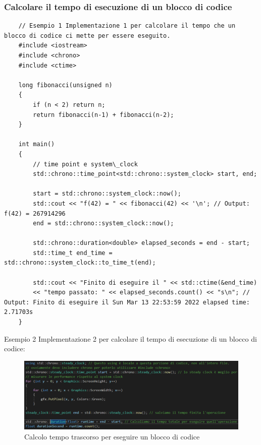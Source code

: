 \subsubsection{Calcolare il tempo di esecuzione di un blocco di codice}

\begin{lstlisting}
	// Esempio 1 Implementazione 1 per calcolare il tempo che un blocco di codice ci mette per essere eseguito.
	#include <iostream>
	#include <chrono>
	#include <ctime>
	
	long fibonacci(unsigned n)
	{
		if (n < 2) return n;
		return fibonacci(n-1) + fibonacci(n-2);
	}
	
	int main()
	{
		// time point e system\_clock
		std::chrono::time_point<std::chrono::system_clock> start, end;
		
		start = std::chrono::system_clock::now();
		std::cout << "f(42) = " << fibonacci(42) << '\n'; // Output: f(42) = 267914296
		end = std::chrono::system_clock::now();
		
		std::chrono::duration<double> elapsed_seconds = end - start;
		std::time_t end_time = std::chrono::system_clock::to_time_t(end);
		
		std::cout << "Finito di eseguire il " << std::ctime(&end_time)
		<< "tempo passato: " << elapsed_seconds.count() << "s\n"; // Output: Finito di eseguire il Sun Mar 13 22:53:59 2022 elapsed time: 2.71703s
	}
\end{lstlisting}

\textsf{\small Esempio 2 Implementazione 2 per calcolare il tempo di esecuzione di un blocco di codice: } \\

\begin{figure}[ht]
	\centering
	\includegraphics[width=1\textwidth, height=1\textheight, keepaspectratio]{./imgs/chrono_steady_clock_per_misurare_il_tempo_tra_una_operazione_e_l_altra_col_using.png}
	\caption{Calcolo tempo trascorso per eseguire un blocco di codice}
	\label{fig:chrono_steady_clock_per_misurare_il_tempo_tra_una_operazione_e_l_altra_col_using}
\end{figure}

